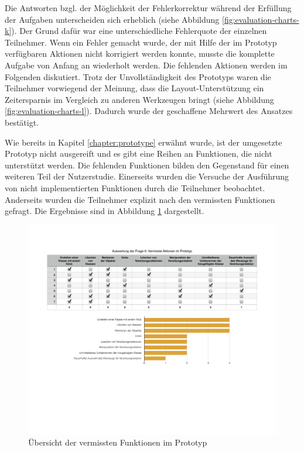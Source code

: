 Die Antworten bzgl. der Möglichkeit der Fehlerkorrektur während der Erfüllung der Aufgaben unterscheiden sich erheblich (siehe Abbildung \ref{fig:evaluation-charts-k}). Der Grund dafür war eine unterschiedliche Fehlerquote der einzelnen Teilnehmer. Wenn ein Fehler gemacht wurde, der mit Hilfe der im Prototyp verfügbaren Aktionen nicht korrigiert werden konnte, musste die komplette Aufgabe von Anfang an wiederholt werden. Die fehlenden Aktionen werden im Folgenden diskutiert. Trotz der Unvollständigkeit des Prototyps waren die Teilnehmer vorwiegend der Meinung, dass die Layout-Unterstützung ein Zeitersparnis im Vergleich zu anderen Werkzeugen bringt (siehe Abbildung \ref{fig:evaluation-charts-l}). Dadurch wurde der geschaffene Mehrwert des Ansatzes bestätigt.

Wie bereits in Kapitel \ref{chapter:prototype} erwähnt wurde, ist der umgesetzte Prototyp nicht ausgereift und es gibt eine Reihen an Funktionen, die nicht unterstützt werden. Die fehlenden Funktionen bilden den Gegenstand für einen weiteren Teil der Nutzerstudie. Einerseits wurden die Versuche der Ausführung von nicht implementierten Funktionen durch die Teilnehmer beobachtet. Anderseits wurden die Teilnehmer explizit nach den vermissten Funktionen gefragt. Die Ergebnisse sind in Abbildung \ref{fig:missed-prototype-functions} dargestellt.

\begin{figure}[hbt]
    \centering
    \includegraphics[width=\textwidth]{assets/missed-prototype-functions}
    \caption{Übersicht der vermissten Funktionen im Prototyp}
    \label{fig:missed-prototype-functions}
\end{figure}

